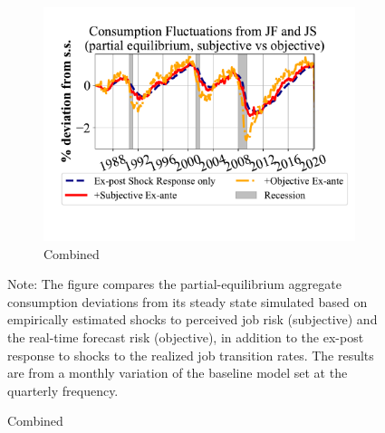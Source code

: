 \begin{figure}[ht]
\begin{subfigure}{0.32\linewidth}
    \end{subfigure}
    \hfill
    \begin{subfigure}{0.32\linewidth}
         \caption*{Combined}
        \includegraphics[width=\linewidth]{text/Chapter2/Figures/consumption_pe_JS_JF_deviation_machine_as_rational_monthly.pdf}
   
    \end{subfigure}

    \begin{flushleft}
        \footnotesize 
        Note: The figure compares the partial-equilibrium aggregate consumption deviations from its steady state simulated based on empirically estimated shocks to perceived job risk (subjective) and the real-time forecast risk (objective), in addition to the ex-post response to shocks to the realized job transition rates. The results are from a monthly variation of the baseline model set at the quarterly frequency.
    \end{flushleft}
\end{figure}

